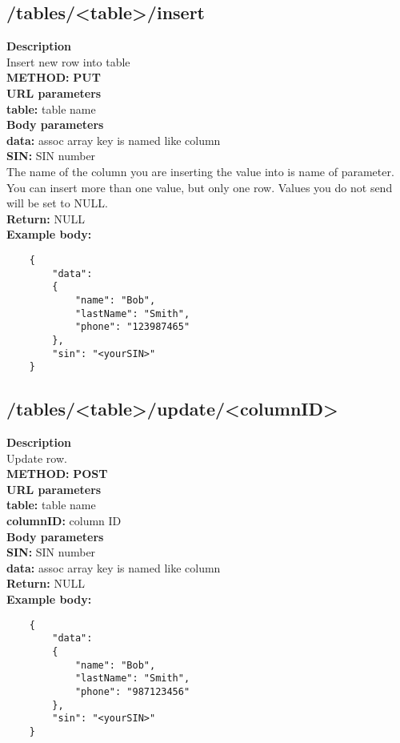 \documentclass[a4paper, 12pt]{report}
\begin{document}
\subsection{/tables/<table>/insert}
\textbf{\color{redText} Description} \\
Insert new row into table\\
\textbf{\color{redText} METHOD: } \textbf{PUT} \\
\textbf{\color{redText} URL parameters} \\
\textbf{table: } table name\\
\textbf{\color{redText} Body parameters} \\
\textbf{data: } assoc array key is named like column\\
\textbf{SIN: } SIN number\\
The name of the column you are inserting the value into is name of parameter. You can insert more than one value, but only one row. Values you do not send will be set to NULL.\\
\textbf{\color{redText} Return: } NULL \\
\textbf{\color{redText} Example body: }
\begin{lstlisting}
    {
        "data":
        {
            "name": "Bob",
            "lastName": "Smith",
            "phone": "123987465"
        },
        "sin": "<yourSIN>"
    }
\end{lstlisting}

\subsection{/tables/<table>/update/<columnID>}
\textbf{\color{redText} Description} \\
Update row. \\
\textbf{\color{redText} METHOD: } \textbf{POST} \\
\textbf{\color{redText} URL parameters} \\
\textbf{table: } table name\\
\textbf{columnID: } column ID\\
\textbf{\color{redText} Body parameters} \\
\textbf{SIN: } SIN number\\
\textbf{data: } assoc array key is named like column\\
\textbf{\color{redText} Return: } NULL \\
\textbf{\color{redText} Example body: }
\begin{lstlisting}
    {
        "data":
        {
            "name": "Bob",
            "lastName": "Smith",
            "phone": "987123456"
        },
        "sin": "<yourSIN>"
    }
\end{lstlisting}
\end{document}
